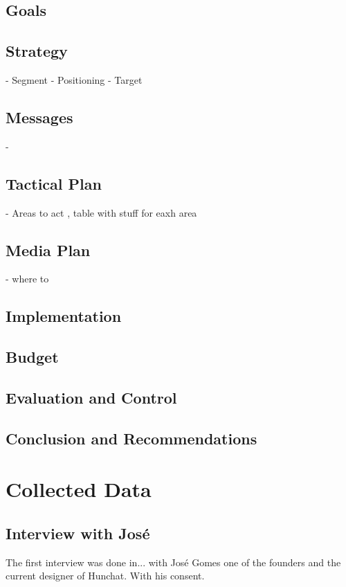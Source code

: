\documentclass[12pt]{article}
\begin{document}
\subsection{Goals}
\subsection{Strategy}
- Segment
- Positioning
- Target
\subsection{Messages}
-
\subsection{Tactical Plan}
- Areas to act , table with stuff for eaxh area
\subsection{Media Plan}
- where to
\subsection{Implementation}
\subsection{Budget}
\subsection{Evaluation and Control}
\subsection{Conclusion and Recommendations}




\cleardoublepage
\newpage	

\printbibliography
\cleardoublepage

\appendix

\section{Collected Data}\label{data}
\subsection {Interview with José} \label{ze}
The first interview was done in... with José Gomes one of the founders and the current designer of Hunchat. With his consent.
\end{document}

